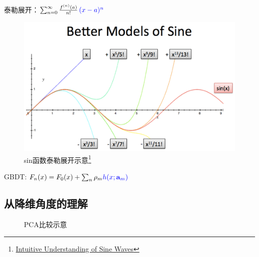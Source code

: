 \begin{frame}
    泰勒展开：$\sum _{n=0}^{\infty }{\frac{f^{(n)}(a)}{n!}}\,\textcolor{blue}{(x-a)^{n}}$

    \begin{figure}[!tb]
        \includegraphics[width=\twopicwidth]{figure/gbdt/sine-better-models}
        \caption{sin函数泰勒展开示意\footnote{
                 \href{https://betterexplained.com/articles/intuitive-understanding-of-sine-waves/}{Intuitive Understanding of Sine Waves}}}
    \end{figure}

    GBDT: $F_n(x) = F_{0}(x) + \sum_n \rho_m \textcolor{blue}{h(x; \mathbf{a}_m)}$
\end{frame}


\subsection{从降维角度的理解}
\begin{frame}
    \begin{figure}
        \centering
        \hfil
        \subfigure[][]{
            \resizebox{0.50\linewidth}{!}{}
        }
        \caption{PCA\footnotemark 比较示意}
    \end{figure}

\end{frame}


